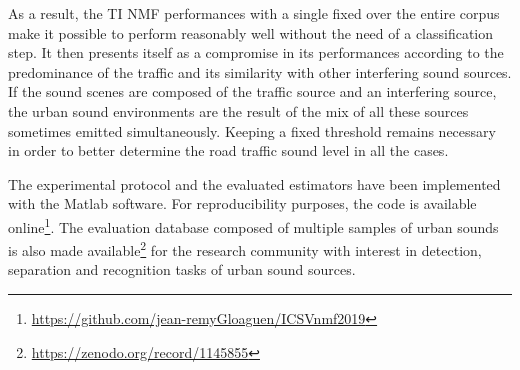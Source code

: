 \documentclass[12pt,english,twoside]{article}
\begin{document}
As a result, the TI NMF performances with a single fixed over the entire corpus make it possible to perform reasonably well without the need of a classification step. It then presents itself as a compromise in its performances according to the predominance of the traffic and its similarity with other interfering sound sources. If the sound scenes are composed of the traffic source and an interfering source, the urban sound environments are the result of the mix of all these sources sometimes emitted simultaneously. Keeping a fixed threshold remains necessary in order to better determine the road traffic sound level in all the cases.

The experimental protocol and the evaluated estimators have been implemented with the Matlab software.
For reproducibility purposes, the code is available
online\footnote{\url{https://github.com/jean-remyGloaguen/ICSVnmf2019}}. The evaluation database composed of multiple samples of urban sounds is also made available\footnote{\url{https://zenodo.org/record/1145855}} for the research community with interest in detection, separation and recognition tasks of urban sound sources.
\end{document}
